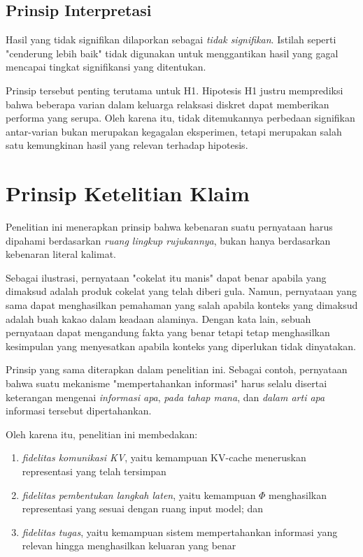 \subsection{Prinsip Interpretasi}

Hasil yang tidak signifikan dilaporkan sebagai \textit{tidak signifikan}. Istilah seperti "cenderung lebih baik" tidak digunakan untuk menggantikan hasil yang gagal mencapai tingkat signifikansi yang ditentukan.

Prinsip tersebut penting terutama untuk H1. Hipotesis H1 justru memprediksi bahwa beberapa varian dalam keluarga relaksasi diskret dapat memberikan performa yang serupa. Oleh karena itu, tidak ditemukannya perbedaan signifikan antar-varian bukan merupakan kegagalan eksperimen, tetapi merupakan salah satu kemungkinan hasil yang relevan terhadap hipotesis.

\section{Prinsip Ketelitian Klaim}

Penelitian ini menerapkan prinsip bahwa kebenaran suatu pernyataan harus dipahami berdasarkan \textit{ruang lingkup rujukannya}, bukan hanya berdasarkan kebenaran literal kalimat.

Sebagai ilustrasi, pernyataan "cokelat itu manis" dapat benar apabila yang dimaksud adalah produk cokelat yang telah diberi gula. Namun, pernyataan yang sama dapat menghasilkan pemahaman yang salah apabila konteks yang dimaksud adalah buah kakao dalam keadaan alaminya. Dengan kata lain, sebuah pernyataan dapat mengandung fakta yang benar tetapi tetap menghasilkan kesimpulan yang menyesatkan apabila konteks yang diperlukan tidak dinyatakan.

Prinsip yang sama diterapkan dalam penelitian ini. Sebagai contoh, pernyataan bahwa suatu mekanisme "mempertahankan informasi" harus selalu disertai keterangan mengenai \textit{informasi apa}, \textit{pada tahap mana}, dan \textit{dalam arti apa} informasi tersebut dipertahankan.

Oleh karena itu, penelitian ini membedakan:

\begin{enumerate}
    \item \textit{fidelitas komunikasi KV}, yaitu kemampuan KV-cache meneruskan representasi yang telah tersimpan
    \item \textit{fidelitas pembentukan langkah laten}, yaitu kemampuan \(\Phi\) menghasilkan representasi yang sesuai dengan ruang input model; dan
    \item \textit{fidelitas tugas}, yaitu kemampuan sistem mempertahankan informasi yang relevan hingga menghasilkan keluaran yang benar
\end{enumerate}

